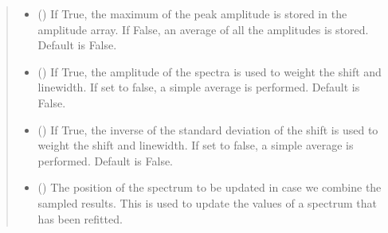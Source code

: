 \documentclass[letterpaper,10pt,english]{sphinxmanual}
\begin{document}
\begin{fulllineitems}
\begin{fulllineitems}
\begin{quote}
\begin{description}
\begin{itemize}
\item {} 
\sphinxAtStartPar
{} (\sphinxstyleliteralemphasis{\sphinxupquote{, }}) \textendash{} If True, the maximum of the peak amplitude is stored in the amplitude array. If False, an average of all the amplitudes is stored. Default is False.

\item {} 
\sphinxAtStartPar
{} (\sphinxstyleliteralemphasis{\sphinxupquote{, }}) \textendash{} If True, the amplitude of the spectra is used to weight the shift and linewidth. If set to false, a simple average is performed. Default is False.

\item {} 
\sphinxAtStartPar
{} (\sphinxstyleliteralemphasis{\sphinxupquote{, }}) \textendash{} If True, the inverse of the standard deviation of the shift is used to weight the shift and linewidth. If set to false, a simple average is performed. Default is False.

\item {} 
\sphinxAtStartPar
{} (\sphinxstyleliteralemphasis{\sphinxupquote{, }}) \textendash{} The position of the spectrum to be updated in case we combine the sampled results. This is used to update the values of a spectrum that has been re\sphinxhyphen{}fitted.

\end{itemize}

\end{description}\end{quote}

\end{fulllineitems}



\end{fulllineitems}
\end{document}

